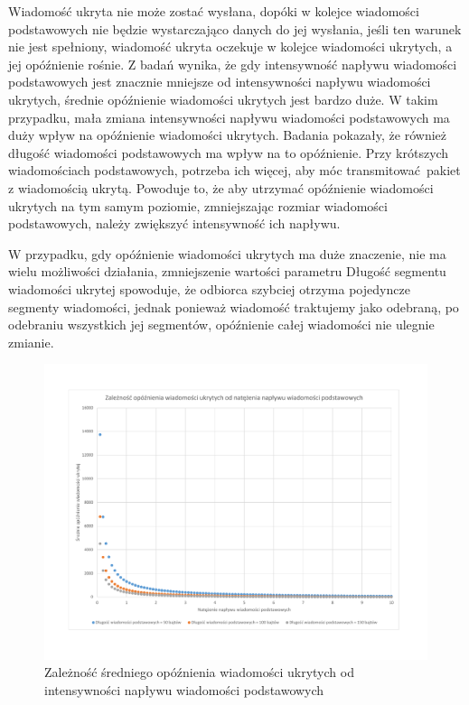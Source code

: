 \documentclass[a4paper, twoside, 12pt]{report}
\begin{document}
            Wiadomość ukryta nie może zostać wysłana, dopóki w kolejce wiadomości
            podstawowych nie będzie wystarczająco danych do jej wysłania, jeśli ten
            warunek nie jest spełniony, wiadomość ukryta oczekuje w kolejce wiadomości
            ukrytych, a jej opóźnienie rośnie. Z badań wynika, że gdy intensywność
            napływu wiadomości podstawowych jest znacznie mniejsze od intensywności
            napływu wiadomości ukrytych, średnie opóźnienie wiadomości ukrytych jest
            bardzo duże. W takim przypadku, mała zmiana intensywności napływu wiadomości
            podstawowych ma duży wpływ na opóźnienie wiadomości ukrytych. Badania
            pokazały, że również długość wiadomości podstawowych ma wpływ na to opóźnienie.
            Przy krótszych wiadomościach podstawowych, potrzeba ich więcej, aby móc
            transmitować pakiet z wiadomością ukrytą. Powoduje to, że aby utrzymać
            opóźnienie wiadomości ukrytych na tym samym poziomie, zmniejszając rozmiar
            wiadomości podstawowych, należy zwiększyć intensywność ich napływu.

            W przypadku, gdy opóźnienie wiadomości ukrytych ma duże znaczenie,
            nie ma wielu możliwości działania, zmniejszenie wartości parametru Długość
            segmentu wiadomości ukrytej spowoduje, że odbiorca szybciej otrzyma
            pojedyncze segmenty wiadomości, jednak ponieważ wiadomość traktujemy jako odebraną,
            po odebraniu wszystkich jej segmentów, opóźnienie całej wiadomości
            nie ulegnie zmianie.

        \begin{figure}[h]
                \centering
                \includegraphics[scale=0.6]{opoznienieukrytychodpodstawowych}
                \caption{Zależność średniego opóźnienia wiadomości ukrytych od
                    intensywności napływu wiadomości podstawowych}
                \label{OPOZNIENIEUKRYTYCHODPODSTAWOWYCH}
        \end{figure}
\end{document}
